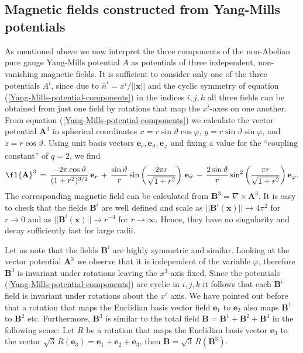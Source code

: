 \documentclass[10pt]{iopart}
\def \Eq{equation }
\def \bA{{\mathbf{A}}}
\def \bB{{\mathbf{B}}}
\def \bx{{\mathbf{x}}}
\def \be{{\mathbf{e}}}
\begin{document}
\subsection{Magnetic fields constructed from Yang-Mills potentials}

As mentioned above we now interpret the three components of the 
non-Abelian pure gauge Yang-Mills potential $A$ as potentials of 
three independent, non-vanishing magnetic fields.
It is sufficient to consider only one of the three potentials $A^i$,
since due to $\hat{n}^i = x^i/||\bx||$ and the cyclic symmetry 
of \Eq  (\ref{Yang-Mills-potential-components})
in the indices $i,j,k$ 
all three fields can be obtained from just one field by rotations
that map the $x^i$-axes on one another.
From \Eq  (\ref{Yang-Mills-potential-components}) we calculate 
the vector potential $\bA^3$ in spherical coordinates
$   x = r \sin\vartheta \cos\varphi$,
$   y = r \sin\vartheta \sin\varphi$, and 
$   z = r \cos\vartheta$.
Using unit basis vectors $\be_r,\be_\vartheta, \be_\varphi $ and fixing a value for
the ``coupling constant'' of $q=2$, we find
\begin{eqnarray}
\fl
   \bA^3 \,=\, 
   \frac{-2\pi \cos\vartheta }{(1+r^2)^{3/2}}\,\be_r \,+\,
   \frac{\sin\vartheta}{r}\sin\left(\frac{2\pi r}{\sqrt{1+r^2}}\right)\,
   \be_\vartheta
   \,-\,\frac{2 \sin\vartheta}{r}\sin^2\left( \frac{\pi r}{\sqrt{1+r^2}}\right)
   \be_\varphi. \label{Equation-Ai}
\end{eqnarray}
The corresponding magnetic field can be calculated from $\bB^3 =
 \nabla\times\bA^3$. It is easy to check that the fields $\bB^i$ are well
 defined and scale as
$ || \bB^i(\bx) || \rightarrow  4\pi^2$ for $r\rightarrow 0$ and as
$ || \bB^i(\bx) || \rightarrow  r^{-4}$ for $r\rightarrow \infty$.
Hence, they have no singularity and decay sufficiently fast for large radii.



Let us note that the fields $\bB^i$ are highly symmetric and
similar. Looking at the vector potential $\bA^3$ we observe that
it is independent of the variable $\varphi$, therefore $\bB^3$ is invariant
under rotations leaving the $x^3$-axis fixed.
Since the potentials (\ref{Yang-Mills-potential-components}) are
cyclic in $i,j,k$ it follows that each $\bB^i$ field 
is invariant under rotations about the $x^i$ axis.
We have pointed out before that a rotation that maps the 
Euclidian basis vector field $\be_{1}$ to $\be_{2}$ also maps $\bB^1$ to
$\bB^2$ etc. 
Furthermore,  $\bB^3$ is similar to the total field
$\bB = \bB^1+\bB^2+\bB^3$ in the following sense:
Let $R$ be a rotation that maps the Euclidian basis vector $\be_{3}$
to the vector $\sqrt{3}\,R(\be_{3}) = \be_{1}+\be_{2}+\be_{3}$, then
$\bB = \sqrt{3}\,R(\bB^3)$.
\end{document}
